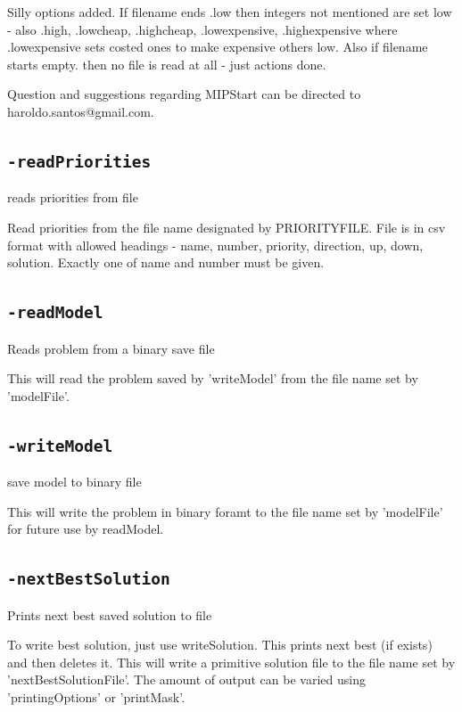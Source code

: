 \documentclass[11pt,a4paper]{article}
\begin{document}
 Silly options added.  If filename ends .low then integers not mentioned are set low - also .high, .lowcheap, .highcheap, .lowexpensive, .highexpensive where .lowexpensive sets costed ones to make expensive others low. Also if filename starts empty. then no file is read at all - just actions done. 

 Question and suggestions regarding MIPStart can be directed to
 haroldo.santos@gmail.com. 

\subsection*{\texttt{-readPriorities}}

reads priorities from file

Read priorities from the file name designated by PRIORITYFILE. File is in csv format with allowed headings - name, number, priority, direction, up, down, solution.  Exactly one of name and number must be given.

\subsection*{\texttt{-readModel}}

Reads problem from a binary save file

This will read the problem saved by 'writeModel' from the file name set by 'modelFile'.

\subsection*{\texttt{-writeModel}}

save model to binary file

This will write the problem in binary foramt to the file name set by 'modelFile' for future use by readModel.

\subsection*{\texttt{-nextBestSolution}}

Prints next best saved solution to file

To write best solution, just use writeSolution.  This prints next best (if exists) and then deletes it. This will write a primitive solution file to the file name set by 'nextBestSolutionFile'. The amount of output can be varied using 'printingOptions' or 'printMask'.
\end{document}

